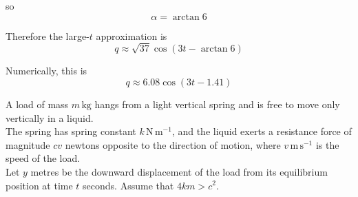 \documentclass[leqno]{article}
\begin{document}
\begin{enumerate}[
  label=\textbf{\arabic*.},
  leftmargin=*,
  topsep=0pt,
  partopsep=0pt,
  parsep=0pt
]
\begin{djsSolution}
\begin{enumerate}[label=\textbf{(\alph*)}]
  so
  \[
  \alpha=\arctan 6
  \]

  Therefore the large-\(t\) approximation is
  \[
  q\approx \sqrt{37}\cos(3t-\arctan 6)
  \]

  Numerically, this is
  \[
  q\approx 6.08\cos(3t-1.41)
  \]
\end{enumerate}
\end{djsSolution}


\newpage

\questionitem

A load of mass $m\,\mathrm{kg}$ hangs from a light vertical spring and is free to move only vertically in a liquid. \\

The spring has spring constant $k\,\mathrm{N\,m^{-1}}$, and the liquid exerts a resistance force of magnitude $c v$ newtons opposite to the direction of motion, where $v\,\mathrm{m\,s^{-1}}$ is the speed of the load. \\

Let $y$ metres be the downward displacement of the load from its equilibrium position at time $t$ seconds. Assume that $4km>c^2$. \\


\end{enumerate}
\end{document}
